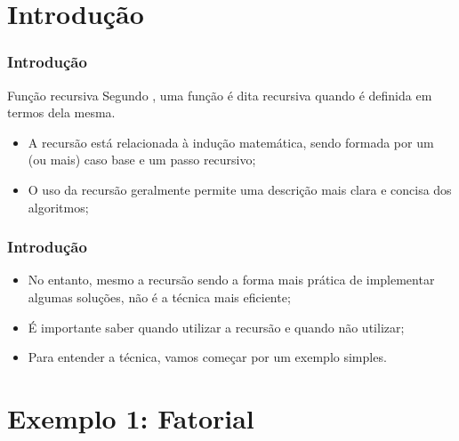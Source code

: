 \documentclass[aspectratio=169]{beamer}
\begin{document}
\section{Introdução} %

\begin{frame}
\frametitle{Introdução}
\begin{block}{Função recursiva}
 Segundo , uma função é dita recursiva quando é definida em termos dela mesma.
\end{block}
\begin{itemize}
\item A recursão está relacionada à indução matemática, sendo formada por um (ou mais) caso base e um passo recursivo;
\item O uso da recursão geralmente permite uma descrição mais clara e concisa dos algoritmos; 
\end{itemize}
\end{frame}


\begin{frame}
\frametitle{Introdução}
\begin{itemize}
\item No entanto, mesmo a recursão sendo a forma mais prática de implementar algumas soluções, não é a técnica mais eficiente;
\item É importante saber quando utilizar a recursão e quando não utilizar;
\item Para entender a técnica, vamos começar por um exemplo simples.
\end{itemize}

\end{frame}


\section{Exemplo 1: Fatorial} 
\end{document}
